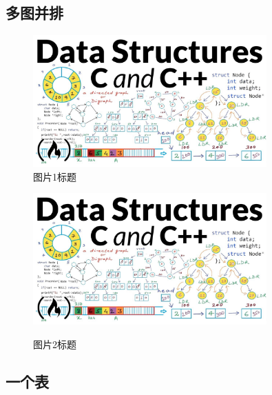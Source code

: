 \documentclass[12pt, a4paper]{article}
\begin{document}
\subsection{多图并排}

\begin{figure}[H]
    \centering
    \begin{minipage}[c]{0.40\textwidth} %
    \centering
    \includegraphics[width=0.8\textwidth]{assets/dataStructures.jpg}\\
    \caption{图片1标题}
    \end{minipage}
    \hspace{1em}
    \begin{minipage}[c]{0.40\textwidth} %
    \centering
    \includegraphics[width=0.8\textwidth]{assets/dataStructures.jpg}\\
    \caption{图片2标题}
    \end{minipage}
\end{figure}

\subsection{一个表}
\end{document}
